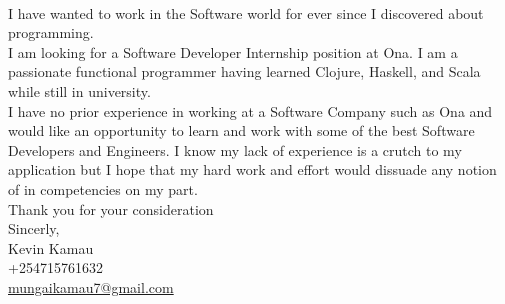 \documentclass[12pt,a4paper]{article}
\begin{document}
\\







\noindent I have wanted to work in the Software world for ever since I discovered about programming.\\


\noindent I am looking for a Software Developer Internship position at Ona. I am a passionate functional programmer having learned Clojure, Haskell, and Scala while still in university.\\

\noindent I have no prior experience in working at a Software Company such as Ona and would like an opportunity to learn and work with some of the best Software Developers and Engineers. I know my lack of experience is a crutch to my application but I hope that my hard work and effort would dissuade any notion of in competencies on my part.\\[0.5cm]

\noindent Thank you for your consideration\\


\noindent Sincerly,\\

\noindent Kevin Kamau\\
\noindent +254715761632\\
\noindent \href{mailto:mungaikamau7@gmail.com}{mungaikamau7@gmail.com}\\
\end{document}
